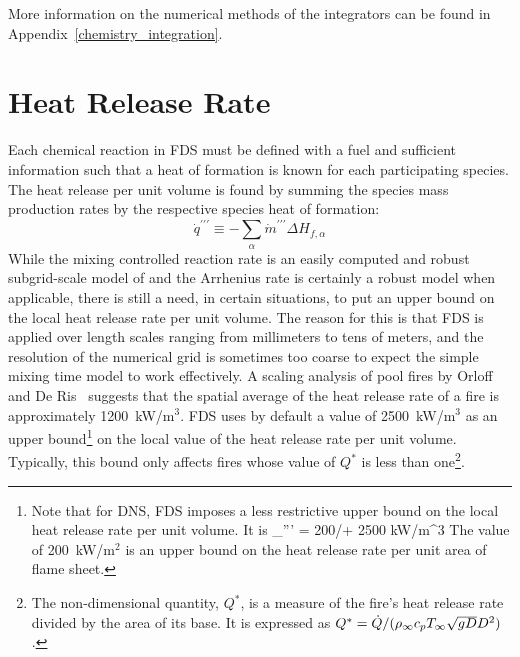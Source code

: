 More information on the numerical methods of the integrators can be found in Appendix~\ref{chemistry_integration}.


\section{Heat Release Rate}

Each chemical reaction in FDS must be defined with a fuel and sufficient information such that a heat of formation is known for each participating species. The heat release per unit volume is found by summing the species mass production rates by the respective species heat of formation:
\begin{equation}\label{eq:vol_heat_gen}
\dot{q}^{\prime\prime\prime} \equiv -\displaystyle \sum_{\alpha} \dot{m}^{\prime\prime\prime} \Delta H_{f,\alpha}
\end{equation}
While the mixing controlled reaction rate is an easily computed and robust subgrid-scale model of and the Arrhenius rate is certainly a robust model when applicable, there is still a need, in certain situations, to put an upper bound on the local heat release rate per unit volume. The reason for
this is that FDS is applied over length scales ranging from millimeters to tens of meters, and the resolution of the numerical grid
is sometimes too coarse to expect the simple mixing time model to work effectively.
A scaling analysis of pool fires by Orloff and De Ris~\cite{Orloff:19th_Symposium} suggests that the spatial average of the
heat release rate of a fire is approximately 1200~kW/m$^3$. FDS uses by default a value of 2500~kW/m$^3$ as an upper bound\footnote{Note that
for DNS, FDS imposes a less restrictive upper bound on the local heat release rate per unit volume. It is
\be \dq_{\max}''' = 200/\dx + 2500 \quad \hbox{kW/m}^3 \ee
The value of 200~kW/m$^2$ is an upper bound on the heat release rate per unit area of flame sheet.}
on the local value of the heat release rate per unit volume. Typically, this bound only affects fires whose value of $Q^*$
is less than one\footnote{The non-dimensional quantity, $Q^*$, is a measure of the fire's heat release rate divided by the
area of its base. It is expressed as $Q^*=\dot{Q}/(\rho_\infty c_p T_\infty \sqrt{g D} D^2)$.}.

